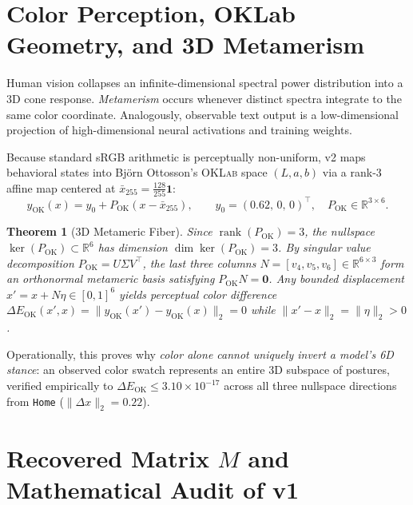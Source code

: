 \documentclass[11pt,letterpaper]{article}
\newtheorem{theorem}{Theorem}
\begin{document}
\section{Color Perception, OKLab Geometry, and 3D Metamerism}

Human vision collapses an infinite-dimensional spectral power distribution into a 3D cone response. \emph{Metamerism} occurs whenever distinct spectra integrate to the same color coordinate. Analogously, observable text output is a low-dimensional projection of high-dimensional neural activations and training weights.

Because standard sRGB arithmetic is perceptually non-uniform, v2 maps behavioral states into Björn Ottosson's \textsc{OKLab} space $(L, a, b)$ via a rank-3 affine map centered at $\bar{x}_{255} = \tfrac{128}{255}\mathbf{1}$:
\begin{equation}
  y_{\mathrm{OK}}(x) = y_0 + P_{\mathrm{OK}}(x - \bar{x}_{255}), \qquad y_0 = (0.62,\, 0,\, 0)^\top,\quad P_{\mathrm{OK}} \in \mathbb{R}^{3\times 6}.
\end{equation}

\begin{theorem}[3D Metameric Fiber]
Since $\operatorname{rank}(P_{\mathrm{OK}}) = 3$, the nullspace $\ker(P_{\mathrm{OK}}) \subset \mathbb{R}^6$ has dimension $\dim \ker(P_{\mathrm{OK}}) = 3$. By singular value decomposition $P_{\mathrm{OK}} = U \Sigma V^\top$, the last three columns $N = [v_4, v_5, v_6] \in \mathbb{R}^{6\times 3}$ form an orthonormal metameric basis satisfying $P_{\mathrm{OK}} N = \mathbf{0}$. Any bounded displacement $x' = x + N\eta \in [0,1]^6$ yields perceptual color difference $\Delta E_{\mathrm{OK}}(x', x) = \|y_{\mathrm{OK}}(x') - y_{\mathrm{OK}}(x)\|_2 = 0$ while $\|x' - x\|_2 = \|\eta\|_2 > 0$.
\end{theorem}

Operationally, this proves why \emph{color alone cannot uniquely invert a model's 6D stance}: an observed color swatch represents an entire 3D subspace of postures, verified empirically to $\Delta E_{\mathrm{OK}} \le 3.10 \times 10^{-17}$ across all three nullspace directions from \texttt{Home} ($\|\Delta x\|_2 = 0.22$).

\section{Recovered Matrix $M$ and Mathematical Audit of v1}
\end{document}
